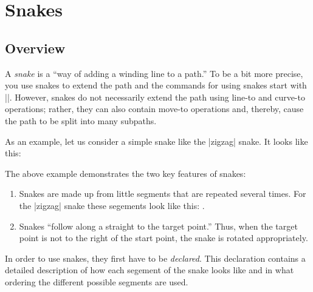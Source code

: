 %
%
%



\section{Snakes}

\label{section-base-snakes}

\subsection{Overview}

A \emph{snake} is a ``way of adding a winding line to a path.'' To be
a bit more precise, you use snakes to extend the path and the
commands for using snakes start with |\pgfpath|. However, snakes do
not necessarily extend the path using line-to and curve-to operations;
rather, they can also contain move-to operations and, thereby, cause
the path to be split into many subpaths.

As an example, let us consider a simple snake like the |zigzag|
snake. It looks like this:

\begin{codeexample}[]
\end{codeexample}

The above example demonstrates the two key features of snakes:
\begin{enumerate}
\item
  Snakes are made up from little segments that are repeated several
  times. For the |zigzag| snake these segements look like this:
  .
\item
  Snakes ``follow along a straight to the target point.'' Thus, when
  the target point is not to the right of the start point, the snake
  is rotated appropriately.
\end{enumerate}


In order to use snakes, they first have to be \emph{declared}. This
declaration contains a detailed description of how each segement of
the snake looks like and in what ordering the different possible
segments are used.


